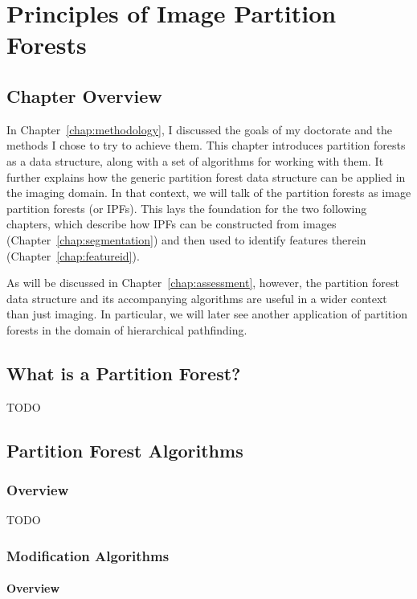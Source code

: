 \chapter{Principles of Image Partition Forests}
\label{chap:ipfs}

\section{Chapter Overview}

In Chapter~\ref{chap:methodology}, I discussed the goals of my doctorate and the methods I chose to try to achieve them. This chapter introduces partition forests as a data structure, along with a set of algorithms for working with them. It further explains how the generic partition forest data structure can be applied in the imaging domain. In that context, we will talk of the partition forests as image partition forests (or IPFs). This lays the foundation for the two following chapters, which describe how IPFs can be constructed from images (Chapter~\ref{chap:segmentation}) and then used to identify features therein (Chapter~\ref{chap:featureid}).

As will be discussed in Chapter~\ref{chap:assessment}, however, the partition forest data structure and its accompanying algorithms are useful in a wider context than just imaging. In particular, we will later see another application of partition forests in the domain of hierarchical pathfinding.

\section{What is a Partition Forest?}

TODO

\section{Partition Forest Algorithms}

\subsection{Overview}

TODO

\subsection{Modification Algorithms}

\subsubsection{Overview}

